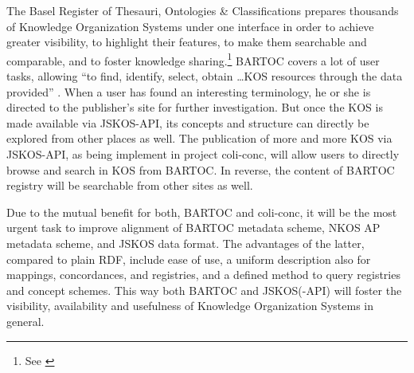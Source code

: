 \documentclass[12pt,a4paper]{llncs}
\begin{document}
The Basel Register of Thesauri, Ontologies \& Classifications prepares thousands of Knowledge Organization Systems under one interface in order to achieve greater visibility, to highlight their features, to make them searchable and comparable, and to foster knowledge sharing.\footnote{See \cite[20]{hlava2011developing}}
BARTOC covers a lot of user tasks, allowing ``to find, identify, select, obtain \ldots KOS resources through the data provided'' \cite[1906]{golub2014terminology}. When a user has found an interesting terminology, he or she is directed to the publisher's site for further investigation. But once the KOS is made available via JSKOS-API, its concepts and structure can directly be explored from other places as well. 
The publication of more and more KOS via JSKOS-API, as being implement in project coli-conc, will allow users to directly browse and search in KOS from BARTOC. In reverse, the content of BARTOC registry will be searchable from other sites as well. 

Due to the mutual benefit for both, BARTOC and coli-conc, it will be the most urgent task to improve alignment of BARTOC metadata scheme, NKOS AP metadata scheme, and JSKOS data format.
The advantages of the latter, compared to plain RDF, include ease of use, a uniform description also for mappings, concordances, and registries, and a defined method to query registries and concept schemes. This way both BARTOC and JSKOS(-API) will foster the visibility, availability and usefulness of Knowledge Organization Systems in general.



\end{document}
